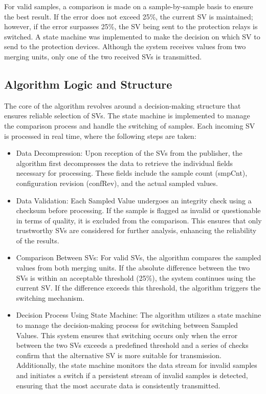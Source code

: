 For valid samples, a comparison is made on a sample-by-sample basis to ensure the best result. If the error does not exceed 25\%, the current SV is maintained; however, if the error surpasses 25\%, the SV being sent to the protection relays is switched. A state machine was implemented to make the decision on which SV to send to the protection devices. Although the system receives values from two merging units, only one of the two received SVs is transmitted.

\subsection{Algorithm Logic and Structure}

The core of the algorithm revolves around a decision-making structure that ensures reliable selection of SVs. The state machine is implemented to manage the comparison process and handle the switching of samples. Each incoming SV is processed in real time, where the following steps are taken:

\begin{itemize}
	\item Data Decompression: Upon reception of the SVs from the publisher, the algorithm first decompresses the data to retrieve the individual fields necessary for processing. These fields include the sample count (smpCnt), configuration revision (confRev), and the actual sampled values.
	\item Data Validation: Each Sampled Value undergoes an integrity check using a checksum before processing. If the sample is flagged as invalid or questionable in terms of quality, it is excluded from the comparison. This ensures that only trustworthy SVs are considered for further analysis, enhancing the reliability of the results.
	\item Comparison Between SVs: For valid SVs, the algorithm compares the sampled values from both merging units. If the absolute difference between the two SVs is within an acceptable threshold (25\%), the system continues using the current SV. If the difference exceeds this threshold, the algorithm triggers the switching mechanism.	
	\item Decision Process Using State Machine: The algorithm utilizes a state machine to manage the decision-making process for switching between Sampled Values. This system ensures that switching occurs only when the error between the two SVs exceeds a predefined threshold and a series of checks confirm that the alternative SV is more suitable for transmission. Additionally, the state machine monitors the data stream for invalid samples and initiates a switch if a persistent stream of invalid samples is detected, ensuring that the most accurate data is consistently transmitted.
\end{itemize}

